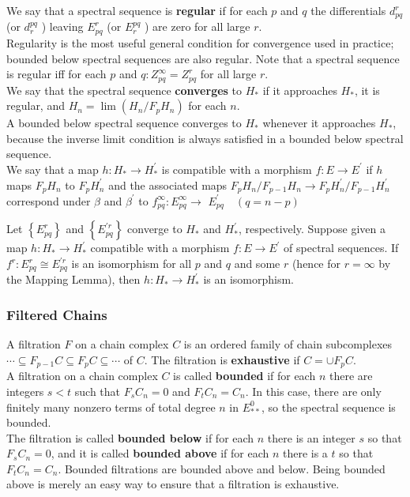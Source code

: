 We say that a spectral sequence is \textbf{regular} if for each $p$ and $q$ the differentials $d_{p q}^r$ (or $d_r^{p q}$ ) leaving $E_{p q}^r$ (or $E_r^{p q}$ ) are zero for all large $r$. \\
Regularity is the most useful general condition for convergence used in practice; bounded below spectral sequences are also regular. Note that a spectral sequence is regular iff for each $p$ and $q: Z_{p q}^{\infty}=Z_{p q}^r$ for all large $r$.\\

We say that the spectral sequence \textbf{converges} to $H_*$ if it approaches $H_*$, it is regular, and $H_n=\lim \left(H_n / F_p H_n\right)$ for each $n$.\\ 
A bounded below spectral sequence converges to $H_*$ whenever it approaches $H_*$, because the inverse limit condition is always satisfied in a bounded below spectral sequence.\\
We say that a map $h: H_* \rightarrow H_*^{\prime}$ is compatible with a morphism $f: E \rightarrow E^{\prime}$ if $h$ maps $F_p H_n$ to $F_p H_n^{\prime}$ and the associated maps $F_p H_n / F_{p-1} H_n \rightarrow F_p H_n^{\prime} / F_{p-1} H_n^{\prime}$ correspond under $\beta$ and $\beta^{\prime}$ to $f_{p q}^{\infty}: E_{p q}^{\infty} \rightarrow$ $E_{p q}^{\prime} \quad(q=n-p)$

\begin{theo}
Let $\left\{E_{p q}^r\right\}$ and $\left\{E_{p q}^{\prime r}\right\}$ converge to $H_*$ and $H_*^{\prime}$, respectively. Suppose given a map $h: H_* \rightarrow H_*^{\prime}$ compatible with a morphism $f: E \rightarrow E^{\prime}$ of spectral sequences. If $f^r: E_{p q}^r \cong E_{p q}^{\prime r}$ is an isomorphism for all $p$ and $q$ and some $r$ (hence for $r=\infty$ by the Mapping Lemma), then $h: H_* \rightarrow H_*^{\prime}$ is an isomorphism. 
\end{theo}

\subsubsection*{Filtered Chains}
A filtration $F$ on a chain complex $C$ is an ordered family of chain subcomplexes $\cdots \subseteq F_{p-1} C \subseteq F_p C \subseteq \cdots$ of $C$. The filtration is \textbf{exhaustive} if $C=\cup F_p C$. \\
A filtration on a chain complex $C$ is called \textbf{bounded} if for each $n$ there are integers $s<t$ such that $F_s C_n=0$ and $F_t C_n=C_n$. In this case, there are only finitely many nonzero terms of total degree $n$ in $E_{* *}^0$, so the spectral sequence is bounded.\\
The filtration is called \textbf{bounded below} if for each $n$ there is an integer $s$ so that $F_s C_n=0$, and it is called \textbf{bounded above} if for each $n$ there is a $t$ so that $F_t C_n=C_n$. Bounded filtrations are bounded above and below. Being bounded above is merely an easy way to ensure that a filtration is exhaustive. %

